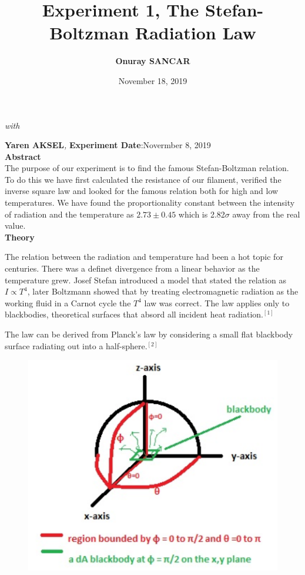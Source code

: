 \documentclass[10pt,a4paper]{article}
\begin{document}
\author{\textbf{Onuray SANCAR}}
\title{\textbf{Experiment 1, The Stefan-Boltzman Radiation Law}}
\date{November 18, 2019}
\maketitle
\textit{with} {\large\textbf{{Yaren AKSEL}}\textit{,} \textbf{Experiment Date}:Novermber 8, 2019\\[3\baselineskip]
\textbf{Abstract}\\[\baselineskip]
The purpose of our experiment is to find the famous Stefan-Boltzman relation. To do this we have first calculated the resistance of our filament, verified the inverse square law and looked for the famous relation both for high and low temperatures. We have found the proportionality constant between the intensity of radiation and the temperature as $2.73\pm0.45$ which is 2.82$\sigma$ away from the real value. \\[\baselineskip]
\textbf{Theory}\\[\baselineskip]
\par The relation between the radiation and temperature had been a hot topic for centuries. There was a definet divergence from a linear behavior as the temperature grew. Josef Stefan introduced a model that stated the relation as $I\propto T^4$, later Boltzmann showed that by treating electromagnetic radiation as the working fluid in a Carnot cycle the $T^4$ law was correct. The law applies only to blackbodies, theoretical surfaces that absord all incident heat radiation.$^{[1]}$
\par The law can be derived from Planck's law by considering a small flat blackbody surface radiating out into a half-sphere.$^{[2]}$
\begin{figure}[H]
	\begin{center}
		\includegraphics[scale=0.6]{pl.png}
	\end{center}
\end{figure}

}
\end{document}
